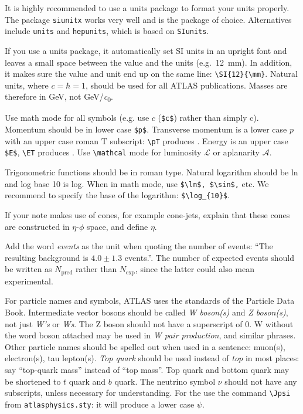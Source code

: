 \documentclass[PAPER,UKenglish]{latex/atlasdoc}
\begin{document}
It is highly recommended to use a units package to format your units properly.
The package \texttt{siunitx} works very well and is the package of choice.
Alternatives include \texttt{units} and \texttt{hepunits},
which is based on \texttt{SIunits}.

If you use a units package, it automatically set SI units in an upright font
and leaves a small space between
the value and the units (e.g.\ \SI{12}{\mm}). 
In addition, it makes sure the value and unit end up on the same line: \verb|\SI{12}{\mm}|.
Natural units, where $c=\hbar=1$, should be used for all
ATLAS publications. Masses are therefore in \si{\GeV}, not \si[per-mode=symbol]{\GeV\per\clight}.

Use math mode for all symbols (e.g. use $c$ (\verb|$c$|) rather than simply c). 
Momentum should be in lower case \verb+$p$+. 
Transverse momentum is a lower case $p$ with an upper case roman $\text{T}$ subscript: 
\verb|\pT| produces \pT.
Energy is an upper case \verb+$E$+, \verb+\ET+ produces \ET.  
Use \verb|\mathcal| mode for luminosity $\mathcal{L}$ or aplanarity
$\mathcal{A}$.

Trigonometric functions should be in roman type. Natural logarithm
should be ln and log base 10 is log.  When in math mode, use
\verb+$\ln$, $\sin$,+ etc. We recommend to specify the base of the
logarithm: \verb+$\log_{10}$+.

If your note makes use of cones, for example cone-jets, explain that
these cones are constructed in $\eta$-$\phi$ space, and define $\eta$.

Add the word \emph{events} as the unit when quoting the number of
events: \enquote{The resulting background is $4.0 \pm 1.3$ events.}.  The
number of expected events should be written as $N_{\text{pred}}$ rather
than $N_{\text{exp}}$, since the latter could also mean experimental.

For particle names and symbols, ATLAS uses the standards of the
Particle Data Book. Intermediate vector bosons should be called
\emph{W boson(s)} and \emph{Z boson(s)}, not just \emph{W's} or
\emph{Ws}. The Z boson should not have a superscript of 0. W without
the word boson attached may be used in \emph{W pair production}, and
similar phrases.  Other particle names should be spelled out when used
in a sentence: muon(s), electron(s), tau lepton(s). \emph{Top quark}
should be used instead of \emph{top} in most places: 
say \enquote{top-quark mass} instead of \enquote{top mass}.
Top quark and bottom quark may be shortened to $t$ quark and $b$ quark. 
The neutrino symbol $\nu$ should not have any subscripts, unless necessary for
understanding.
For the \Jpsi{} use the command \verb+\Jpsi+ from 
\texttt{atlasphysics.sty}: it will produce a lower case $\psi$.
\end{document}
